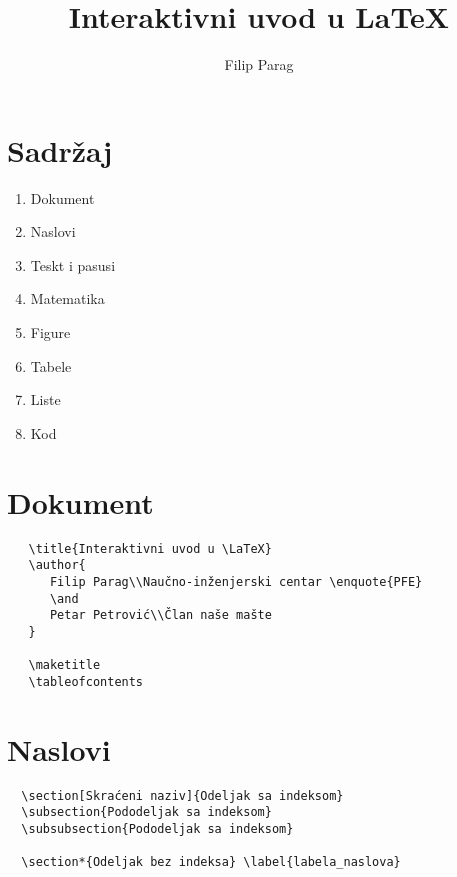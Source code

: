 \documentclass[a4paper]{article}
\title{Interaktivni uvod u \LaTeX}
\author{Filip Parag}
\begin{document}
\maketitle

\section*{Sadržaj}

\begin{enumerate}
   \item Dokument
   \item Naslovi
   \item Teskt i pasusi
   \item Matematika
   \item Figure
   \item Tabele
   \item Liste
   \item Kod
\end{enumerate}

\pagebreak

\section*{Dokument}

\begin{verbatim}
   \title{Interaktivni uvod u \LaTeX}
   \author{
      Filip Parag\\Naučno-inženjerski centar \enquote{PFE}
      \and
      Petar Petrović\\Član naše mašte
   }

   \maketitle
   \tableofcontents
\end{verbatim}

\pagebreak

\section*{Naslovi}

\begin{verbatim}
  \section[Skraćeni naziv]{Odeljak sa indeksom}
  \subsection{Pododeljak sa indeksom}
  \subsubsection{Pododeljak sa indeksom}

  \section*{Odeljak bez indeksa} \label{labela_naslova}
\end{verbatim}
\end{document}
